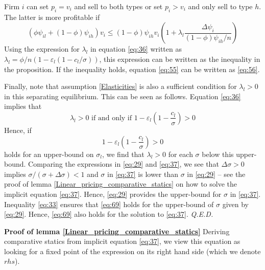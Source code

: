 \documentclass[12pt,english,a4paper]{article}
\newcommand{\qed}{\hspace*{\fill} {\em Q.E.D.}}
\begin{document}
Firm \(i\) can set \(p_i = v_i\) and sell to both types or set \(p_i>v_i\) and only sell to type \(h\). The latter is more profitable if
\begin{equation}
\label{eq:3}
(\phi \psi_{il} + (1-\phi)\psi_{ih})v_i \leq (1-\phi)\psi_{ih} v_i \left( 1+\lambda_l \frac{\Delta \psi_i}{(1-\phi)\psi_{ih}/n} \right)
\end{equation}
Using the expression for \(\lambda_l\) in equation \eqref{eq:36} written as \(\lambda_l = \phi/n (1 - \varepsilon_l (1-c_{l}/\sigma))\), this expression can be written as the inequality in the proposition. If the inequality holds, equation \eqref{eq:55} can be written as \eqref{eq:56}.

Finally, note that assumption \ref{Elasticities} is also a sufficient condition for \(\lambda_l > 0\) in this separating equilibrium. This can be seen as follows. Equation \eqref{eq:36} implies that
\begin{equation}
\label{eq:68}
\lambda_l > 0 \text{ if and only if } 1-\varepsilon_l \left(1-\frac{c_l}{\sigma} \right) > 0
\end{equation}
Hence, if
\begin{equation}
\label{eq:69}
1-\varepsilon_l \left(1-\frac{c_l}{\sigma} \right) > 0
\end{equation}
holds for an upper-bound on \(\sigma_l\), we find that \(\lambda_l > 0\) for each \(\sigma\) below this upper-bound. Comparing the expressions in \eqref{eq:29} and \eqref{eq:37}, we see that \(\Delta \sigma > 0\) implies \(\sigma/(\sigma+\Delta\sigma)<1\) and \(\sigma\) in \eqref{eq:37} is lower than \(\sigma\) in \eqref{eq:29} -- see the proof of lemma \ref{Linear_pricing_comparative_statics} on how to solve the implicit equation \eqref{eq:37}. Hence, \eqref{eq:29} provides the upper-bound for \(\sigma\) in \eqref{eq:37}. Inequality \eqref{eq:33} ensures that \eqref{eq:69} holds for the upper-bound of \(\sigma\) given by \eqref{eq:29}. Hence, \eqref{eq:69} also holds for the solution to \eqref{eq:37}. 
 \qed

\textbf{Proof of lemma \ref{Linear_pricing_comparative_statics}}
Deriving comparative statics from implicit equation \eqref{eq:37}, we view this equation as looking for a fixed point of the expression on its right hand side (which we denote \(rhs\)).
\end{document}
